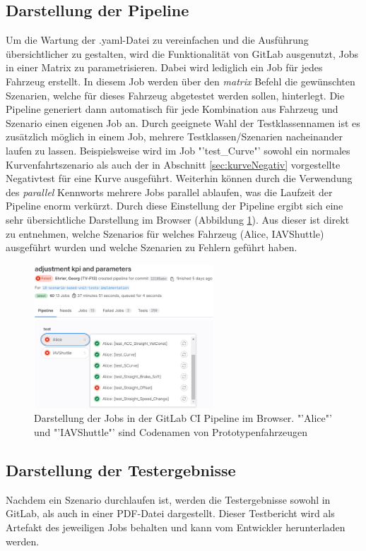 \subsection{Darstellung der Pipeline}
Um die Wartung der .yaml-Datei zu vereinfachen und die Ausführung übersichtlicher zu gestalten, wird die Funktionalität von GitLab ausgenutzt, Jobs in einer Matrix zu parametrisieren. Dabei wird lediglich ein Job für jedes Fahrzeug erstellt. In diesem Job werden über den \textit{matrix} Befehl die gewünschten Szenarien, welche für dieses Fahrzeug abgetestet werden sollen, hinterlegt. Die Pipeline generiert dann automatisch für jede Kombination aus Fahrzeug und Szenario einen eigenen Job an. Durch geeignete Wahl der Testklassennamen ist es zusätzlich möglich in einem Job, mehrere Testklassen/Szenarien nacheinander laufen zu lassen. Beispielsweise wird im Job "'test\_Curve"' sowohl ein normales Kurvenfahrtszenario als auch der in Abschnitt \ref{sec:kurveNegativ} vorgestellte Negativtest für eine Kurve ausgeführt. Weiterhin können durch die Verwendung des \textit{parallel} Kennworts mehrere Jobs parallel ablaufen, was die Laufzeit der Pipeline enorm verkürzt. Durch diese Einstellung der Pipeline ergibt sich eine sehr übersichtliche Darstellung im Browser (Abbildung \ref{fig:uebersicht_pipeline}). Aus dieser ist direkt zu entnehmen, welche Szenarios für welches Fahrzeug (Alice, IAVShuttle) ausgeführt wurden und welche Szenarien zu Fehlern geführt haben.
\begin{figure}[ht]
    \centering
    \includegraphics[width=0.6\textwidth]{figures/3_Implementierung/uebersicht_pipeline.png}
    \caption[Darstellung der Jobs in der GitLab CI Pipeline]{Darstellung der Jobs in der GitLab CI Pipeline im Browser. "'Alice"' und "'IAVShuttle"' sind Codenamen von Prototypenfahrzeugen}
    \label{fig:uebersicht_pipeline}
\end{figure}

\subsection{Darstellung der Testergebnisse}
Nachdem ein Szenario durchlaufen ist, werden die Testergebnisse sowohl in GitLab, als auch in einer PDF-Datei dargestellt. Dieser Testbericht wird als Artefakt des jeweiligen Jobs behalten und kann vom Entwickler herunterladen werden.

